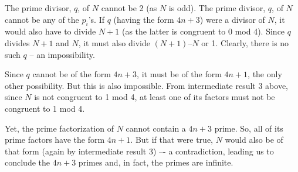 The prime divisor, \(q\), of \(N\) cannot be 2 (as \(N\) is odd). The prime divisor, \(q\), of \(N\) cannot be any of the \(p_i\)’s. If \(q\) (having the form \(4n +3\)) were a divisor of \(N\), it would also have to divide \(N + 1\) (as the latter is congruent to 0 mod 4). Since \(q\) divides \(N + 1\) and \(N\), it must also divide \((N + 1) – N\) or 1. Clearly, there is no such \(q\) – an impossibility.  

Since \(q\) cannot be of the form \(4n +3\), it must be of the form \(4n + 1\), the only other possibility. But this is also impossible. From intermediate result 3 above, since \(N\) is not congruent to 1 mod 4, at least one of its factors must not be congruent to 1 mod 4. 

Yet, the prime factorization of \(N\) cannot contain a \(4n +3\) prime. So, all of its prime factors have the form \(4n + 1\). But if that were true, \(N\) would also be of that form (again by intermediate result 3) –- a contradiction, leading us to conclude the \(4n +3\) primes and, in fact, the primes are infinite.

